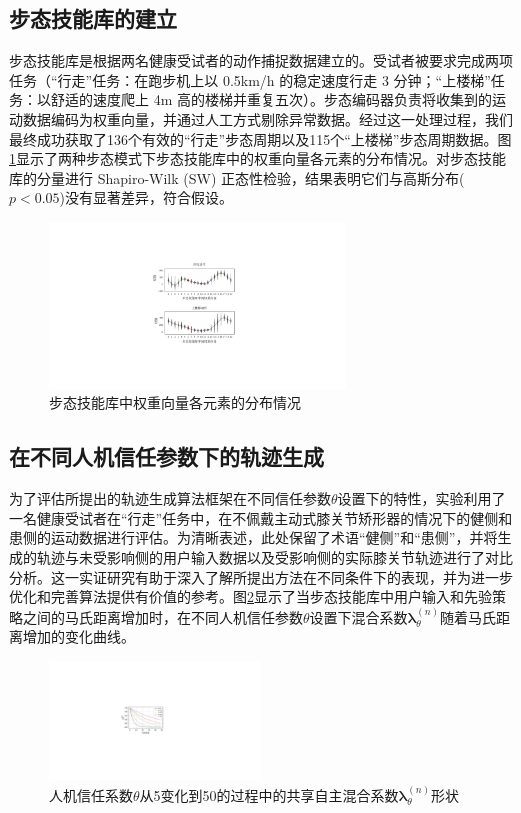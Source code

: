 \subsection{步态技能库的建立}步态技能库是根据两名健康受试者的动作捕捉数据建立的。受试者被要求完成两项任务（``行走''任务：在跑步机上以 0.5km/h 的稳定速度行走 3 分钟；``上楼梯''任务：以舒适的速度爬上 4m 高的楼梯并重复五次）。步态编码器负责将收集到的运动数据编码为权重向量，并通过人工方式剔除异常数据。经过这一处理过程，我们最终成功获取了136个有效的``行走''步态周期以及115个``上楼梯''步态周期数据。图\ref{fig:5-3}显示了两种步态模式下步态技能库中的权重向量各元素的分布情况。对步态技能库的分量进行 Shapiro-Wilk (SW) 正态性检验，结果表明它们与高斯分布($p<0.05$)没有显著差异，符合假设。
\begin{figure}[htb]
  \centering\includegraphics[width=0.7\textwidth]{figures/5-Fig-3.pdf}
  \caption{步态技能库中权重向量各元素的分布情况}
  \label{fig:5-3}
\end{figure}

\subsection{在不同人机信任参数下的轨迹生成}
为了评估所提出的轨迹生成算法框架在不同信任参数$\theta $设置下的特性，实验利用了一名健康受试者在``行走''任务中，在不佩戴主动式膝关节矫形器的情况下的健侧和患侧的运动数据进行评估。为清晰表述，此处保留了术语``健侧''和``患侧''，并将生成的轨迹与未受影响侧的用户输入数据以及受影响侧的实际膝关节轨迹进行了对比分析。这一实证研究有助于深入了解所提出方法在不同条件下的表现，并为进一步优化和完善算法提供有价值的参考。图\ref{fig:5-4}显示了当步态技能库中用户输入和先验策略之间的马氏距离增加时，在不同人机信任参数$\theta $设置下混合系数$\pmb{\lambda }_\theta ^{(n)}$随着马氏距离增加的变化曲线。

\begin{figure}[htb]
  \centering\includegraphics[width=0.5\textwidth]{figures/5-Fig-4.pdf}
  \caption{人机信任系数$\theta $从5变化到50的过程中的共享自主混合系数$\pmb{\lambda}_\theta ^{(n)}$形状}
  \label{fig:5-4}
\end{figure}

